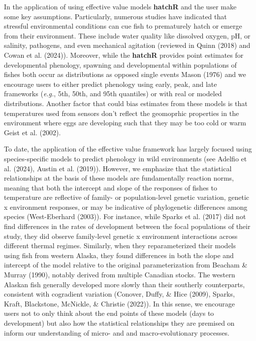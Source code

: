 \documentclass[10pt,a4paper,onecolumn]{article}
\begin{document}
In the application of using effective value models \textbf{hatchR} and
the user make some key assumptions. Particularly, numerous studies have
indicated that stressful environmental conditions can cue fish to
prematurely hatch or emerge from their environment. These include water
quality like dissolved oxygen, pH, or salinity, pathogens, and even
mechanical agitation (reviewed in Quinn (2018) and Cowan et al. (2024)).
Moreover, while the \textbf{hatchR} provides point estimates for
developmental phenology, spawning and developmental within populations
of fishes both occur as distributions as opposed single events Mason
(1976) and we encourage users to either predict phenology using early,
peak, and late frameworks (\emph{e.g.}, 5th, 50th, and 95th quantiles)
or with real or modeled distributions. Another factor that could bias
estimates from these models is that temperatures used from sensors don't
reflect the geomoprhic properties in the environment where eggs are
developing such that they may be too cold or warm Geist et al. (2002).

To date, the application of the effective value framework has largely
focused using species-specific models to predict phenology in wild
environments (see Adelfio et al. (2024), Austin et al. (2019)). However,
we emphasize that the statistical relationships at the basis of these
models are fundamentally reaction norms, meaning that both the intercept
and slope of the responses of fishes to temperature are reflective of
family- or population-level genetic variation, genetic x environment
responses, or may be indicative of phylogenetic differences among
species (West-Eberhard (2003)). For instance, while Sparks et al. (2017)
did not find differences in the rates of development between the focal
populations of their study, they did observe family-level genetic x
environment interactions across different thermal regimes. Similarly,
when they reparameterized their models using fish from western Alaska,
they found differences in both the slope and intercept of the model
relative to the original parameterization from Beacham \& Murray (1990),
notably derived from multiple Canadian stocks. The western Alaskan fish
generally developed more slowly than their southerly counterparts,
consistent with cogradient variation (Conover, Duffy, \& Hice (2009),
Sparks, Kraft, Blackstone, McNickle, \& Christie (2022)). In this sense,
we encourage users not to only think about the end points of these
models (days to development) but also how the statistical relationships
they are premised on inform our understanding of micro- and and
macro-evolutionary processes.
\end{document}
